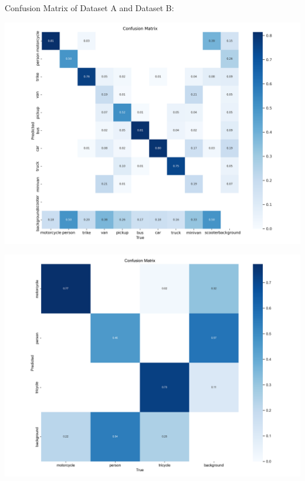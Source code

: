 \documentclass[a0,portrait]{a0poster}
\begin{document}
\begin{multicols}{2}
			Confusion Matrix of Dataset A and Dataset B:
			\begin{center}\vspace{1cm}
				\begin{minipage}{0.2\textwidth}
					\centering
					\includegraphics[width=\textwidth]{a_confusion_matrix.png}
					\label{fig:dAConfusionMatrix}
				\end{minipage}\hfill
				\begin{minipage}{0.2\textwidth}
					\includegraphics[width=\textwidth]{b_confusion_matrix.png}
					\label{fig:dBConfusionMatrix}
				\end{minipage}\vspace{1cm}
			\end{center}\vspace{1cm}


\end{multicols}
\end{document}
